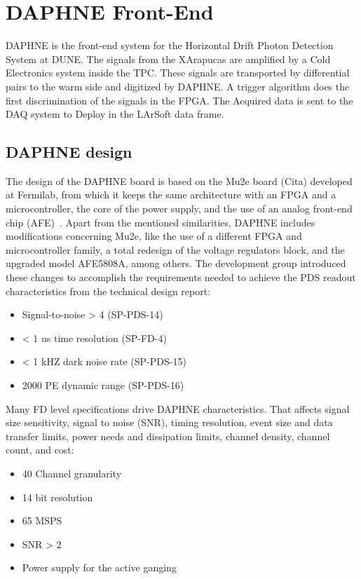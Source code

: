 \section{DAPHNE Front-End}
\label{sec:system}

DAPHNE is the front-end system for the Horizontal Drift Photon Detection System at DUNE. The signals from the XArapucas are amplified by a Cold Electronics system inside the TPC. These signals are transported by differential pairs to the warm side and digitized by DAPHNE. A trigger algorithm does the first discrimination of the signals in the FPGA. The Acquired data is sent to the DAQ system to Deploy in the LArSoft data frame.

\subsection{DAPHNE design}
\label{sec:requirements}

The design of the DAPHNE board is based on the Mu2e board (Cita) developed at Fermilab, from which it keeps the same architecture with an FPGA and a microcontroller, the core of the power supply, and the use of an analog front-end chip (AFE)~\cite{IEEE_Ref1:afe5808amanual}. Apart from the mentioned similarities, DAPHNE includes modifications concerning Mu2e, like the use of a different FPGA and microcontroller family, a total redesign of the voltage regulators block, and the upgraded model AFE5808A, among others. The development group introduced these changes to accomplish the requirements needed to achieve the PDS readout characteristics from the technical design report:

\begin{itemize}
    \item Signal-to-noise > 4 			\cite{} (SP-PDS-14)
    \item < 1 us time resolution 		\cite{} (SP-FD-4)
    \item < 1 kHZ dark noise rate 		\cite{} (SP-PDS-15)
    \item 2000 PE dynamic range 		\cite{} (SP-PDS-16)
\end{itemize}

Many FD level specifications drive DAPHNE characteristics. That affects signal size sensitivity, signal to noise (SNR), timing resolution, event size and data transfer limits, power needs and dissipation limits, channel density, channel count, and cost:

\begin{itemize}
\item 40 Channel granularity
\item 14 bit resolution
\item 65 MSPS
\item SNR > 2
\item Power supply for the active ganging
\end{itemize}

